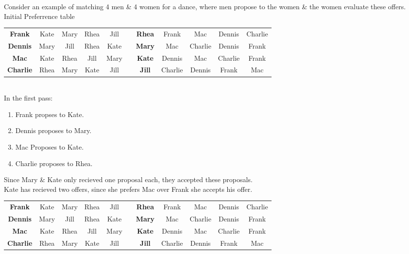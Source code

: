 \documentclass[11pt,a4paper]{article}
\begin{document}
Consider an example of matching 4 men \& 4 women for a dance, where men propose to the women \& the women evaluate these offers.\\
Initial Preferrence table\\
\begin{tabular}{|c|cccc|c|c|cccc|}
  \cline{1-5} \cline{7-11}
  \textbf{Frank} & Kate & Mary & Rhea & Jill & \quad &\textbf{Rhea} & Frank & Mac & Dennis & Charlie\\
  \textbf{Dennis} & Mary & Jill & Rhea & Kate & \quad & \textbf{Mary} & Mac & Charlie & Dennis & Frank\\
  \textbf{Mac} & Kate & Rhea & Jill & Mary & \quad & \textbf{Kate} & Dennis & Mac & Charlie & Frank\\
  \textbf{Charlie} & Rhea & Mary & Kate & Jill & \quad & \textbf{Jill} & Charlie & Dennis & Frank & Mac\\
  \cline{1-5} \cline{7-11}
\end{tabular}\\
In the first pass:
\begin{enumerate}
  \item Frank propses to Kate.
  \item Dennis proposes to Mary.
  \item Mac Proposes to Kate.
  \item Charlie proposes to Rhea.
\end{enumerate}
Since Mary \& Kate only recieved one proposal each, they accepted these proposals.\\
Kate has recieved two offers, since she prefers Mac over Frank she accepts his offer.\\
\begin{tabular}{|c|cccc|c|c|cccc|}
  \cline{1-5} \cline{7-11}
  \textbf{Frank} & \cellcolor{red!25}Kate & Mary & Rhea & Jill & \quad &\textbf{Rhea} & Frank & Mac & Dennis & \cellcolor{green!25} Charlie\\
  \textbf{Dennis} & \cellcolor{green!25} Mary & Jill & Rhea & Kate & \quad & \textbf{Mary} & Mac & Charlie & \cellcolor{green!25} Dennis & Frank\\
  \textbf{Mac} & \cellcolor{green!25} Kate & Rhea & Jill & Mary & \quad & \textbf{Kate} & Dennis & \cellcolor{green!25} Mac & Charlie & \cellcolor{red!25} Frank\\
  \textbf{Charlie} & \cellcolor{green!25} Rhea & Mary & Kate & Jill & \quad & \textbf{Jill} & Charlie & Dennis & Frank & Mac\\
  \cline{1-5} \cline{7-11}
\end{tabular}\\
\end{document}
